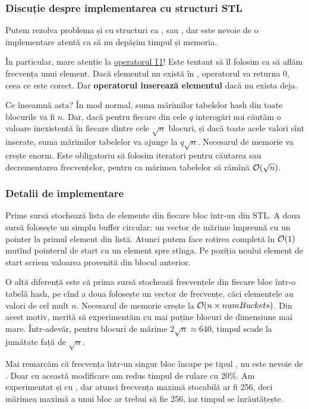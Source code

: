 \documentclass[../main.tex]{subfiles}
\begin{document}
\subsubsection*{Discuție despre implementarea cu structuri STL}

Putem rezolva problema și cu structuri ca ,  sau , dar este nevoie de o implementare atentă ca să nu depășim timpul și memoria.

În particular, mare atenție la \href{https://en.cppreference.com/w/cpp/container/map/operator_at}{operatorul \texttt{[]}}! Este tentant să îl folosim ca să aflăm frecvența unui element. Dacă elementul nu există în , operatorul va returna 0, ceea ce este corect. Dar \textbf{operatorul inserează elementul} dacă nu exista deja.

Ce înseamnă asta? În mod normal, suma mărimilor tabelelor hash din toate blocurile va fi $n$. Dar, dacă pentru fiecare din cele $q$ interogări noi căutăm o valoare inexistentă în fiecare dintre cele $\sqrt{n}$ blocuri, și dacă toate acele valori sînt inserate, suma mărimilor tabelelor va ajunge la $q \sqrt{n}$. Necesarul de memorie va crește enorm. Este obligatoriu să folosim iteratori pentru căutarea sau decrementarea frecvențelor, pentru ca mărimea tabelelor să rămînă $\mathcal{O}(\sqrt{n})$.

\subsubsection*{Detalii de implementare}

Prime sursă stochează lista de elemente din fiecare bloc într-un  din STL. A doua sursă folosește un simplu buffer circular: un vector de mărime  împreună cu un pointer la primul element din listă. Atunci putem face rotirea completă în $\mathcal{O}(1)$ mutînd pointerul de start cu un element spre stînga. Pe poziția noului element de start scriem valoarea provenită din blocul anterior.

O altă diferență este că prima sursă stochează frecvențele din fiecare bloc într-o tabelă hash, pe cînd a doua folosește un vector de frecvențe, căci elementele au valori de cel mult $n$. Necesarul de memorie crește la $\mathcal{O}(n \times numBuckets)$. Din acest motiv, merită să experimentăm cu mai puține blocuri de dimensiune mai mare. Într-adevăr, pentru blocuri de mărime $2 \sqrt{n} \approx 640$, timpul scade la jumătate față de $\sqrt{n}$.

Mai remarcăm că frecvența într-un singur bloc încape pe tipul , nu este nevoie de . Doar cu această modificare am redus timpul de rulare cu 20\%. Am experimentat și cu , dar atunci frecvența maximă stocabilă ar fi 256, deci mărimea maximă a unui bloc ar trebui să fie 256, iar timpul se înrăutățește.
\end{document}
